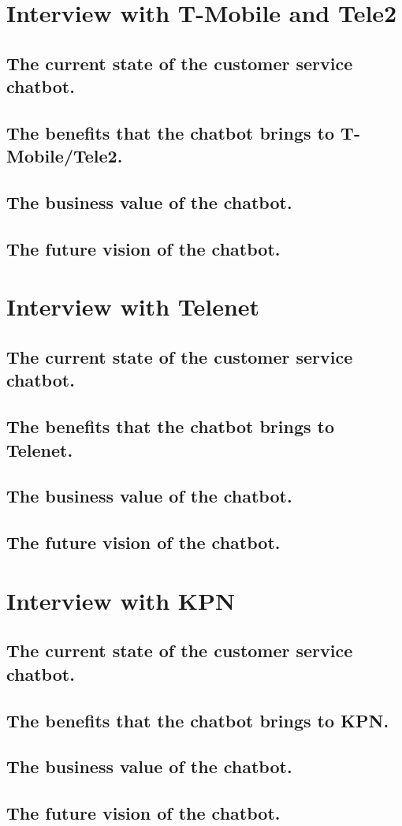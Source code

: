 \begin{appendices}
	\section{Interview with T-Mobile and Tele2}
	\label{in:T-Mobile}
	\subsection{The current state of the customer service chatbot.}
	\subsection{The benefits that the chatbot brings to T-Mobile/Tele2.}
	\subsection{The business value of the chatbot.}
	\subsection{The future vision of the chatbot.}
	
	\section{Interview with Telenet}
	\label{in:Telenet}
	\subsection{The current state of the customer service chatbot.}
	\subsection{The benefits that the chatbot brings to Telenet.}
	\subsection{The business value of the chatbot.}
	\subsection{The future vision of the chatbot.}
	
	\section{Interview with KPN}
	\label{in:KPN}
	\subsection{The current state of the customer service chatbot.}
	\subsection{The benefits that the chatbot brings to KPN.}
	\subsection{The business value of the chatbot.}
	\subsection{The future vision of the chatbot.}
	
	
\end{appendices}

